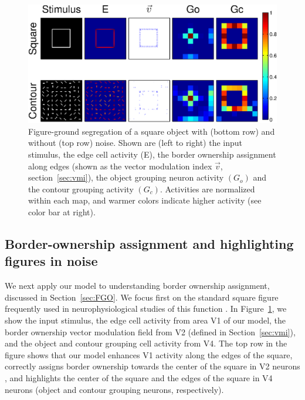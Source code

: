 \begin{figure}[t]
\centering
\includegraphics[width=\textwidth]{Contour/figs/Fig6.eps}
\makeatletter
\let\@currsize\normalsize
\caption[Figure-ground segregation with and without noise]{Figure-ground segregation of a square object with (bottom
row) and without (top row) noise. Shown are (left to right) the input
stimulus, the edge cell activity (E), the border ownership assignment along edges (shown as the vector modulation index $\vec{v}$, section~\ref{sec:vmi}), the object grouping neuron activity $(G_o)$
 and the contour grouping activity $(G_c)$.  Activities are normalized within each map, and warmer colors indicate higher activity (see color bar at right).}
\label{Fig:Square}
\end{figure}

\subsection{Border-ownership assignment and highlighting figures in noise}
\label{sec:BOS}

We next apply our model to understanding border ownership assignment,
discussed in Section~\ref{sec:FGO}. We focus first on the standard
square figure frequently used in neurophysiological studies of this
function
\citep{Zhou_etal00,Qiu_etal07,Sugihara_etal11,Williford_vonderHeydt13,Williford_vonderHeydt14,Martin_vonderHeydt15}.
In Figure~\ref{Fig:Square}, we show the input stimulus, the edge cell
activity from area V1 of our model, the border ownership vector
modulation field from V2 (defined in Section~\ref{sec:vmi}), and the
object and contour grouping cell activity from V4.  The top row in the
figure shows that our model enhances V1 activity along the edges of
the square, correctly assigns border ownership towards the center of
the square in V2 neurons \citep[in agreement with][] {Zhou_etal00},
and highlights the center of the square and the edges of the square in
V4 neurons (object and contour grouping neurons, respectively).

